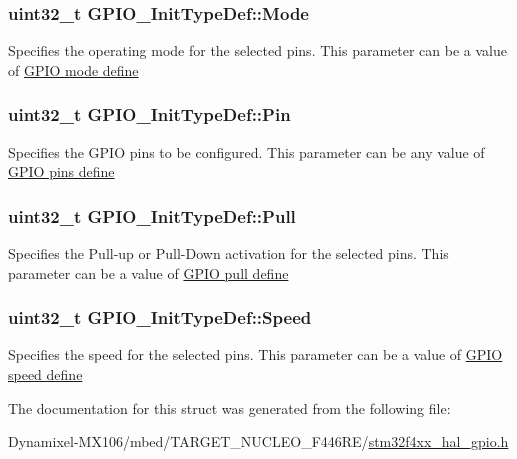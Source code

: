 \subsubsection[{\texorpdfstring{Mode}{Mode}}]{\setlength{\rightskip}{0pt plus 5cm}uint32\+\_\+t G\+P\+I\+O\+\_\+\+Init\+Type\+Def\+::\+Mode}\hypertarget{struct_g_p_i_o___init_type_def_a3731d84343e65a98fdf51056a8d30321}{}\label{struct_g_p_i_o___init_type_def_a3731d84343e65a98fdf51056a8d30321}
Specifies the operating mode for the selected pins. This parameter can be a value of \hyperlink{group___g_p_i_o__mode__define}{G\+P\+IO mode define} 
\subsubsection[{\texorpdfstring{Pin}{Pin}}]{\setlength{\rightskip}{0pt plus 5cm}uint32\+\_\+t G\+P\+I\+O\+\_\+\+Init\+Type\+Def\+::\+Pin}\hypertarget{struct_g_p_i_o___init_type_def_aa807fb62b2b2cf937092abba81370b87}{}\label{struct_g_p_i_o___init_type_def_aa807fb62b2b2cf937092abba81370b87}
Specifies the G\+P\+IO pins to be configured. This parameter can be any value of \hyperlink{group___g_p_i_o__pins__define}{G\+P\+IO pins define} 
\subsubsection[{\texorpdfstring{Pull}{Pull}}]{\setlength{\rightskip}{0pt plus 5cm}uint32\+\_\+t G\+P\+I\+O\+\_\+\+Init\+Type\+Def\+::\+Pull}\hypertarget{struct_g_p_i_o___init_type_def_aa2d3a6b0c4e10ac20882b4a37799ced1}{}\label{struct_g_p_i_o___init_type_def_aa2d3a6b0c4e10ac20882b4a37799ced1}
Specifies the Pull-\/up or Pull-\/\+Down activation for the selected pins. This parameter can be a value of \hyperlink{group___g_p_i_o__pull__define}{G\+P\+IO pull define} 
\subsubsection[{\texorpdfstring{Speed}{Speed}}]{\setlength{\rightskip}{0pt plus 5cm}uint32\+\_\+t G\+P\+I\+O\+\_\+\+Init\+Type\+Def\+::\+Speed}\hypertarget{struct_g_p_i_o___init_type_def_aae3b8ba407fb4f974cbce9cc03fc189d}{}\label{struct_g_p_i_o___init_type_def_aae3b8ba407fb4f974cbce9cc03fc189d}
Specifies the speed for the selected pins. This parameter can be a value of \hyperlink{group___g_p_i_o__speed__define}{G\+P\+IO speed define} 

The documentation for this struct was generated from the following file\+:\begin{DoxyCompactItemize}
\item 
Dynamixel-\/\+M\+X106/mbed/\+T\+A\+R\+G\+E\+T\+\_\+\+N\+U\+C\+L\+E\+O\+\_\+\+F446\+R\+E/\hyperlink{stm32f4xx__hal__gpio_8h}{stm32f4xx\+\_\+hal\+\_\+gpio.\+h}\end{DoxyCompactItemize}
